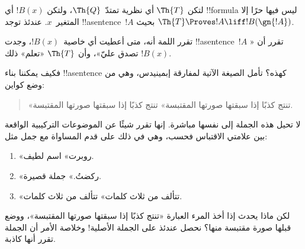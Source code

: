 \documentclass[../../../include/open-logic-section]{subfiles}
\begin{document}
\begin{lem}
لتكن $\Th{T}$ أي نظرية تمتدّ~$\Th{Q}$، ولتكن $!B(x)$ أي !!{formula}
ليس فيها حرًا إلا المتغير~$x$. عندئذ توجد !!a{sentence}~$!A$ بحيث
$\Th{T}\Proves !A\liff !B(\gn{!A})$.
\end{lem}

تقرر اللمة أنه، متى أعطيت أي خاصية~$!B(x)$، وجدت !!a{sentence}~$!A$
تقرر أن «$!B(x)$ تصدق عليّ»، وأن $\Th{T}$ «تعلم» ذلك.

فكيف يمكننا بناء !!a{sentence} كهذه؟ تأمل الصيغة الآتية لمفارقة
إبمينيدس، وهي من وضع كواين:
\begin{quote}
«تنتج كذبًا إذا سبقتها صورتها المقتبسة» تنتج كذبًا إذا سبقتها صورتها
المقتبسة.
\end{quote}
لا تحيل هذه الجملة إلى نفسها مباشرة. إنها تقرر شيئًا عن الموضوعات
التركيبية الواقعة بين علامتي الاقتباس فحسب، وهي في ذلك على قدم المساواة
مع جمل مثل:
\begin{enumerate}
\item «روبرت» اسم لطيف.
\item «ركضتُ.» جملة قصيرة.
\item «تتألف من ثلاث كلمات» تتألف من ثلاث كلمات.
\end{enumerate}
لكن ماذا يحدث إذا أخذ المرء العبارة «تنتج كذبًا إذا سبقتها صورتها
المقتبسة»، ووضع قبلها صورة مقتبسة منها؟ نحصل عندئذ على الجملة
الأصلية!{} وخلاصة الأمر أن الجملة تقرر أنها كاذبة.
\end{document}
